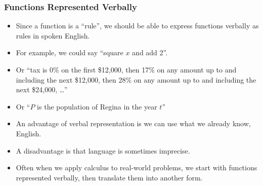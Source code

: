 \documentclass[serif,ignorenonframetext]{beamer}
\begin{document}
\begin{frame}
  \frametitle{Functions Represented Verbally}
  \begin{itemize}[<+->]
  \item Since a function is a ``rule'', we should be able to express
    functions verbally as rules in spoken English.
  \item For example, we could say ``square
    $x$ and add 2''.
  \item Or ``tax is 0\% on the first \$12,000, then 17\% on any amount
    up to and including the next \$12,000, then 28\% on any amount up
    to and including the next \$24,000, \ldots''
  \item Or ``$P$ is the population of Regina in the year $t$''
  \item An advantage of verbal representation is we can use what we
    already know, English.
  \item A disadvantage is that language is sometimes imprecise.
  \item Often when we apply calculus to real-world problems, we
    start with functions represented verbally, then translate
    them into another form.
  \end{itemize}
\end{frame}
\end{document}
